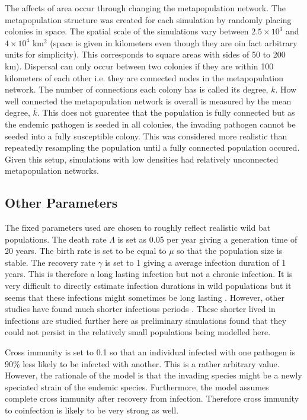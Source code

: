The affects of area occur through changing the metapopulation network.
The metapopulation structure was created for each simulation by randomly placing colonies in space.
The spatial scale of the simulations vary between \ensuremath{2.5\times 10^{3}} and \ensuremath{4\times 10^{4}} km$^2$ (space is given in kilometers even though they are oin fact arbitrary units for simplicity).
This corresponds to square areas with sides of 50 to 200 km).
Dispersal can only occur between two colonies if they are within 100 kilometers of each other i.e. they are connected nodes in the metapopulation network.
The number of connections each colony has is called its degree, $k$.
How well connected the metapopulation network is overall is measured by the mean degree, $\bar{k}$.
This does not guarentee that the population is fully connected but as the endemic pathogen is seeded in all colonies, the invading pathogen cannot be seeded into a fully susceptible colony.
This was considered more realistic than repeatedly resampling the population until a fully connected population occured.
Given this setup, simulations with low densities had relatively unconnected metapopulation networks.






\subsection{Other Parameters}

The fixed parameters used are chosen to roughly reflect realistic wild bat populations. 
The death rate $\Lambda$ is set as 0.05 per year giving a generation time of 20 years.
The birth rate is set to be equal to $\mu$ so that the population size is stable.
The recovery rate $\gamma$ is set to 1 giving a average infection duration of 1 years. 
This is therefore a long lasting infection but not a chronic infection. 
It is very difficult to directly estimate infection durations in wild populations but it seems that these infections might sometimes be long lasting \cite{peel2012henipavirus, plowright2015ecological}.
However, other studies have found much shorter infectious periods \cite{amengual2007temporal}.
These shorter lived in infections are studied further here as preliminary simulations found that they could not persist in the relatively small populations being modelled here.

Cross immunity is set to 0.1 so that an individual infected with one pathogen is 90\% less likely to be infected with another.
This is a rather arbitrary value.
However, the rationale of the model is that the invading species might be a newly speciated strain of the endemic species.
Furthermore, the model assumes complete cross immunity after recovery from infection.
Therefore cross immunity to coinfection is likely to be very strong as well.

